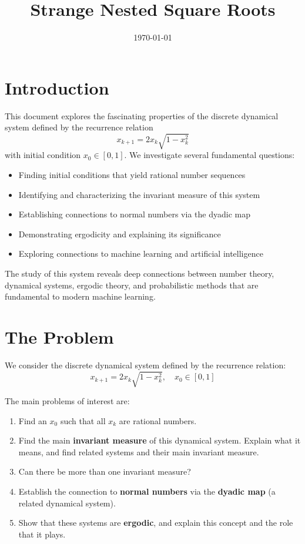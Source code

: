 \documentclass[12pt,a4paper]{article}
\title{Strange Nested Square Roots}
\author{}
\date{\today}
\begin{document}
\maketitle

\section{Introduction}

This document explores the fascinating properties of the discrete dynamical system defined by the recurrence relation
\[
x_{k+1} = 2x_k\sqrt{1 - x_k^2}
\]
with initial condition $x_0 \in [0,1]$. We investigate several fundamental questions:

\begin{itemize}
    \item Finding initial conditions that yield rational number sequences
    \item Identifying and characterizing the invariant measure of this system
    \item Establishing connections to normal numbers via the dyadic map
    \item Demonstrating ergodicity and explaining its significance
    \item Exploring connections to machine learning and artificial intelligence
\end{itemize}

The study of this system reveals deep connections between number theory, dynamical systems, ergodic theory, and probabilistic methods that are fundamental to modern machine learning.

\section{The Problem}

We consider the discrete dynamical system defined by the recurrence relation:
\[
x_{k+1} = 2x_k\sqrt{1 - x_k^2}, \quad x_0 \in [0,1]
\]

The main problems of interest are:

\begin{enumerate}
    \item Find an $x_0$ such that all $x_k$ are rational numbers.
    \item Find the main \textbf{invariant measure} of this dynamical system. Explain what it means, and find related systems and their main invariant measure.
    \item Can there be more than one invariant measure?
    \item Establish the connection to \textbf{normal numbers} via the \textbf{dyadic map} (a related dynamical system).
    \item Show that these systems are \textbf{ergodic}, and explain this concept and the role that it plays.
\end{enumerate}
\end{document}
